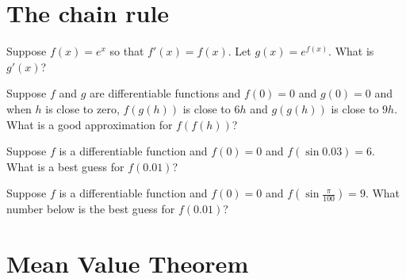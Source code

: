 \documentclass{ximera}
\begin{document}
\clearpage

\section{The chain rule}

\begin{problem}
  Suppose $f(x) = e^x$ so that $f'(x) = f(x)$.  Let $g(x) = e^{f(x)}$.  What is $g'(x)$?
  \begin{multipleChoice}
  \end{multipleChoice}
\end{problem}

\begin{problem}
  Suppose $f$ and $g$ are differentiable functions and $f(0) = 0$ and
  $g(0) = 0$ and when $h$ is close to zero, $f(g(h))$ is close to $6h$
  and $g(g(h))$ is close to $9h$.  What is a good approximation for $f(f(h))$?
  \begin{multipleChoice}
  \end{multipleChoice}
\end{problem}

\begin{problem}
  Suppose $f$ is a differentiable function and $f(0) = 0$ and
  $f(\sin 0.03) = 6$.  What is a best guess for $f(0.01)$?
  \begin{multipleChoice}
  \end{multipleChoice}
\end{problem}

\begin{problem}
  Suppose $f$ is a differentiable function and $f(0) = 0$ and
  $f(\sin \frac{\pi}{100}) = 9$.  What number below is the best guess for $f(0.01)$?
  \begin{multipleChoice}
  \end{multipleChoice}
\end{problem}

\clearpage

\section{Mean Value Theorem}
\end{document}
